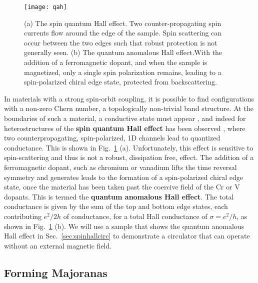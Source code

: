 \begin{figure}
  \texttt{[image: qah]}
  \caption[Quantum spin Hall and quantum anomalous Hall effect]
  {\label{fig:qah}(a) The spin quantum Hall effect. Two counter-propagating spin currents flow around the edge of the sample. Spin scattering can occur between the two
  edges such that robust protection is not generally seen. (b) The quantum anomalous Hall effect.With the addition of a ferromagnetic dopant, and when the sample is magnetized,
  only a single spin polarization remains, leading to a spin-polarized chiral edge state, protected from backscattering.}
\end{figure}

In materials with a strong spin-orbit coupling, it is possible to find configurations with a non-zero Chern number, a topologically non-trivial band structure.
At the boundaries of such a material, a conductive state must appear \cite{PhysRevLett.93.156804,PhysRevLett.92.126603}, and indeed for heterostructures of 
the \textbf{spin quantum Hall effect} has been observed \cite{Konig766}, where two counterpropagating, spin-polarized, 1D channels lead to quantized conductance. This is
shown in Fig.~\ref{fig:qah} (a). Unfortunately, this effect is sensitive to spin-scattering and thus is not a robust, dissipation free, effect.
The addition of a ferromagnetic dopant, such as chromium or vanadium lifts the
time reversal symmetry and generates leads to the formation of a spin-polarized chiral edge state, once the material has been taken past the coercive field of the
Cr or V dopants. This is termed the \textbf{quantum anomalous Hall effect}. The total conductance is given by the sum of the top and bottom edge states,
each contributing $e^2/2h$ of conductance, for a total Hall conductance of $\sigma = e^2/h$, as shown in Fig.~\ref{fig:qah} (b). We will use a sample that shows the
quantum anomalous Hall effect in Sec.~\ref{sec:spinhallcirc} to demonstrate a circulator that can operate without an external magnetic field.

\subsection{Forming Majoranas}
\label{sec:makemajo}

